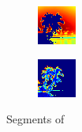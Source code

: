 \begin{figure}
\begin{subfigure}{0.31\textwidth}
        \includegraphics[width=\textwidth]{NegDream.png}
    \end{subfigure}
    \hspace*{\fill}
    \begin{subfigure}{0.31\textwidth}
        \includegraphics[width=\textwidth]{PosDream.png}
    \end{subfigure}
\caption{Segments of }
\label{fig:dream_solution}
\end{figure}